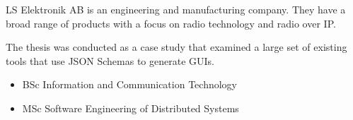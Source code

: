 \documentclass[10pt,a4paper]{altacv}
\begin{document}
\divider

LS Elektronik AB is an engineering and manufacturing company. They have a broad range of products with a focus on radio technology and radio over IP.

\divider

The thesis was conducted as a case study that examined a large set of existing tools that use JSON Schemas to generate GUIs.


\begin{itemize}
    \item BSc Information and Communication Technology
    \item MSc Software Engineering of Distributed Systems
\end{itemize}


\end{document}
